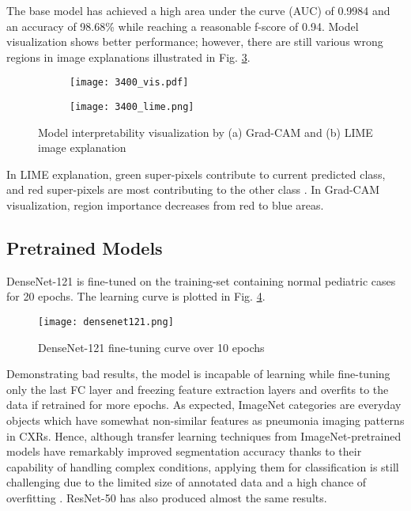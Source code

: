\documentclass{article}
\begin{document}
The base model has achieved a high area under the curve (AUC) of 0.9984 and an accuracy of 98.68\% while reaching a reasonable f-score of 0.94. Model visualization shows better performance; however, there are still various wrong regions in image explanations illustrated in Fig. \ref{fig:3400}.

\begin{figure}[H]
    \begin{subfigure}{0.5\linewidth}
        \centering
        \texttt{[image: 3400\_vis.pdf]}
        \caption{}
        \label{fig:3400_vis}
    \end{subfigure}
    \begin{subfigure}{0.5\linewidth}
        \centering
        \texttt{[image: 3400\_lime.png]}
        \caption{}
        \label{fig:3400_lime}
    \end{subfigure}
\caption{Model interpretability visualization by (a) Grad-CAM and (b) LIME image explanation}
\label{fig:3400}
\end{figure}

In LIME explanation, green super-pixels contribute to current predicted class, and red super-pixels are most contributing to the other class \cite{ribeiro2016should}. In Grad-CAM visualization, region importance decreases from red to blue areas.


\subsection{Pretrained Models}
DenseNet-121 is fine-tuned on the training-set containing normal pediatric cases for 20 epochs. The learning curve is plotted in Fig. \ref{fig:densenet_finetuning}.

\begin{figure}[H]
    \centering
    \texttt{[image: densenet121.png]}
    \caption{DenseNet-121 fine-tuning curve over 10 epochs}
    \label{fig:densenet_finetuning}
\end{figure}

\noindent Demonstrating bad results, the model is incapable of learning while fine-tuning only the last FC layer and freezing feature extraction layers and overfits to the data if retrained for more epochs. As expected, ImageNet categories are everyday objects which have somewhat non-similar features as pneumonia imaging patterns in CXRs. Hence, although transfer learning techniques from ImageNet-pretrained models have remarkably improved segmentation accuracy thanks to their capability of handling complex conditions, applying them for classification is still challenging due to the limited size of annotated data and a high chance of overfitting \cite{godasu2020transfer}. ResNet-50 has also produced almost the same results.
\end{document}
